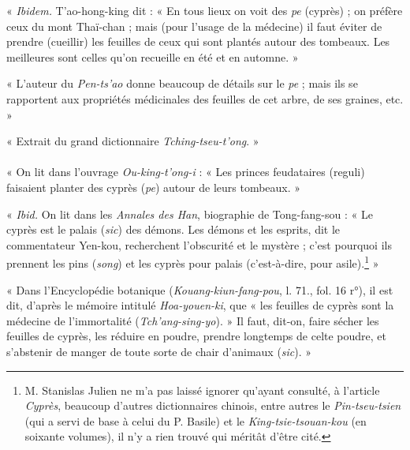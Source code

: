 \documentclass{article}
\begin{document}
« \emph{Ibidem.} T'ao-hong-king dit : « En tous lieux on voit des \emph{pe} (cyprès) ; on préfère ceux du mont Thaï-chan ; mais (pour l'usage de la médecine) il faut éviter de prendre (cueillir) les feuilles de ceux qui sont plantés autour des tombeaux. Les meilleures sont celles qu'on recueille en été et en automne. »

« L'auteur du \emph{Pen-ts'ao} donne beaucoup de détails sur le \emph{pe} ; mais ils se rapportent aux propriétés médicinales des feuilles de cet arbre, de ses graines, etc. »

\begin{center}
« Extrait du grand dictionnaire \emph{Tching-tseu-t'ong}. »
\end{center}

\paragraph{}
« On lit dans l'ouvrage \emph{Ou-king-t'ong-i} : « Les princes feudataires (reguli) faisaient planter des cyprès (\emph{pe}) autour de leurs tombeaux. »

« \emph{Ibid.} On lit dans les \emph{Annales des Han}, biographie de Tong-fang-sou : « Le cyprès est le palais (\emph{sic}) des démons. Les démons et les esprits, dit le commentateur Yen-kou, recherchent l'obscurité et le mystère ; c'est pourquoi ils prennent les pins (\emph{song}) et les cyprès pour palais (c'est-à-dire, pour asile).\footnote{M. Stanislas Julien ne m'a pas laissé ignorer qu'ayant consulté, à l'article \emph{Cyprès}, beaucoup d'autres dictionnaires chinois, entre autres le \emph{Pin-tseu-tsien} (qui a servi de base à celui du P. Basile) et le \emph{King-tsie-tsouan-kou} (en soixante volumes), il n'y a rien trouvé qui méritât d'être cité.} »

« Dans l'Encyclopédie botanique (\emph{Kouang-kiun-fang-pou}, l. 71., fol. 16 r°), il est dit, d'après le mémoire intitulé \emph{Hoa-youen-ki}, que « les feuilles de cyprès sont la médecine de l'immortalité (\emph{Tch'ang-sing-yo}). » Il faut, dit-on, faire sécher les feuilles de cyprès, les réduire en poudre, prendre longtemps de celte poudre, et s'abstenir de manger de toute sorte de chair d'animaux (\emph{sic}). »
\end{document}
